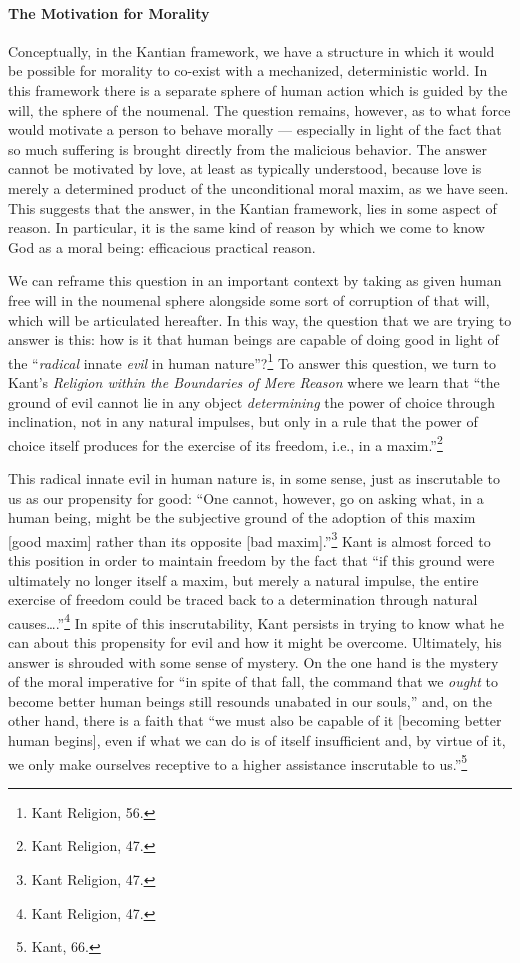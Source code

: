 \documentclass[12pt]{article}
\begin{document}
	\paragraph*{The Motivation for Morality} Conceptually, in the Kantian framework, we have a structure in which it would be possible for morality to co-exist with a mechanized, deterministic world. In this framework there is a separate sphere of human action which is guided by the will, the sphere of the noumenal. The question remains, however, as to what force would motivate a person to behave morally --- especially in light of the fact that so much suffering is brought directly from the malicious behavior. The answer cannot be motivated by love, at least as typically understood, because love is merely a determined product of the unconditional moral maxim, as we have seen. This suggests that the answer, in the Kantian framework, lies in some aspect of reason. In particular, it is the same kind of reason by which we come to know God as a moral being: efficacious practical reason.
	
	We can reframe this question in an important context by taking as given human free will in the noumenal sphere alongside some sort of corruption of that will, which will be articulated hereafter. In this way, the question that we are trying to answer is this: how is it that human beings are capable of doing good in light of the ``\emph{radical} innate \emph{evil} in human nature''?\footnote{Kant Religion, 56.} To answer this question, we turn to Kant's \emph{Religion within the Boundaries of Mere Reason} where we learn that ``the ground of evil cannot lie in any object \emph{determining} the power of choice through inclination, not in any natural impulses, but only in a rule that the power of choice itself produces for the exercise of its freedom, i.e., in a maxim.''\footnote{Kant Religion, 47.}

	This radical innate evil in human nature is, in some sense, just as inscrutable to us as our propensity for good: ``One cannot, however, go on asking what, in a human being, might be the subjective ground of the adoption of this maxim [good maxim] rather than its opposite [bad maxim].''\footnote{Kant Religion, 47.} Kant is almost forced to this position in order to maintain freedom by the fact that ``if this ground were ultimately no longer itself a maxim, but merely a natural impulse, the entire exercise of freedom could be traced back to a determination through natural causes\ldots.''\footnote{Kant Religion, 47.} In spite of this inscrutability, Kant persists in trying to know what he can about this propensity for evil and how it might be overcome. Ultimately, his answer is shrouded with some sense of mystery. On the one hand is the mystery of the moral imperative for ``in spite of that fall, the command that we \emph{ought} to become better human beings still resounds unabated in our souls,'' and, on the other hand, there is a faith that ``we must also be capable of it [becoming better human begins], even if what we can do is of itself insufficient and, by virtue of it, we only make ourselves receptive to a higher assistance inscrutable to us.''\footnote{Kant, 66.} 
	
\end{document}

